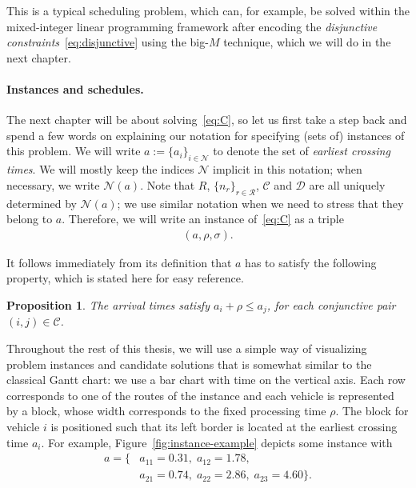 \documentclass[a4paper]{report}
\theoremstyle{definition}
\theoremstyle{plain}
\newtheorem{proposition}{Proposition}[chapter]
\begin{document}
This is a typical scheduling problem, which can, for example, be solved within
the mixed-integer linear programming framework after encoding the \textit{disjunctive
  constraints}~\eqref{eq:disjunctive} using the big-$M$ technique, which we will do in
the next chapter.


\paragraph{Instances and schedules.}

The next chapter will be about solving~\eqref{eq:C}, so let us first take a step back and
spend a few words on explaining our notation for specifying (sets of) instances
of this problem.
%
We will write $a := \{ a_i \}_{i \in \mathcal{N} }$ to denote the set of
\emph{earliest crossing times}.
%
We will mostly keep the indices $\mathcal{N}$ implicit in this notation; when
necessary, we write $\mathcal{N}(a)$.
%
Note that $R$, $\{n_r\}_{r \in \mathcal{R}}$, $\mathcal{C}$ and $\mathcal{D}$
are all uniquely determined by $\mathcal{N}(a)$; we use similar notation when we
need to stress that they belong to $a$.
%
Therefore, we will write an instance of~\eqref{eq:C} as a triple
%
\begin{align*}
  (a, \rho, \sigma) .
\end{align*}

It follows immediately from its definition that $a$ has to satisfy the following
property, which is stated here for easy reference.

\begin{proposition}\label{lemma:arrivals}
  The arrival times satisfy $a_i + \rho \leq a_j$, for each conjunctive pair $(i, j) \in \mathcal{C}$.
\end{proposition}


Throughout the rest of this thesis, we will use a simple way of visualizing
problem instances and candidate solutions that is somewhat similar to the
classical Gantt chart: we use a bar chart with time on the vertical axis.
%
Each row corresponds to one of the routes of the instance and each vehicle
is represented by a block, whose width corresponds to the fixed processing
time $\rho$.
%
The block for vehicle $i$ is positioned such that its 
left border is located at the earliest crossing time $a_i$.
%
For example, Figure~\ref{fig:instance-example} depicts some instance with
\begin{align*}
  a = \{&a_{11} = 0.31, \; a_{12} = 1.78, \\
        &a_{21} = 0.74, \; a_{22} = 2.86, \; a_{23} = 4.60 \} .
\end{align*}
\end{document}
